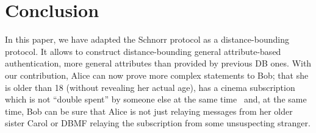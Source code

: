 \section{Conclusion}%
\label{Conclusion}

In this paper, we have adapted the Schnorr protocol as a
distance-bounding protocol.  It allows to construct distance-bounding
general attribute-based authentication, more general attributes than
provided by previous \ac{DB} ones.  With our contribution, Alice can
now prove more complex statements to Bob; \eg that she is older than 18 
(without revealing her actual age), has a cinema subscription which is not 
\enquote{double spent} by someone else at the same time~\cite[\eg][]{AnonPass} 
and, at the same time, Bob can be sure that Alice is not just relaying messages 
from her older sister Carol or \ac{DBMF} relaying the subscription from some 
unsuspecting stranger.

